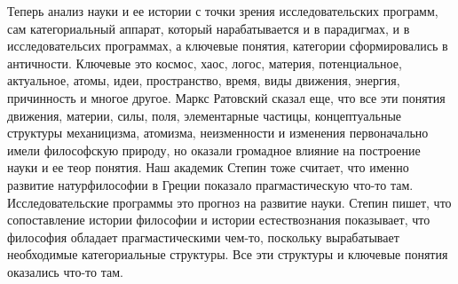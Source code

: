 \documentclass[a4paper, 12pt]{article}
\begin{document}
Теперь анализ науки и ее истории с точки зрения исследовательских 
программ, сам категориальный аппарат, который нарабатывается 
и в парадигмах, и в исследовательсих программах, а ключевые понятия, 
категории сформировались в античности. Ключевые это космос, хаос, логос, 
материя, потенциальное, актуальное, атомы, идеи, пространство, время, 
виды движения, энергия, причинность и многое другое. Маркс Ратовский 
сказал еще, что все эти понятия движения, материи, силы, поля, 
элементарные частицы, концептуальные структуры механицизма, атомизма, 
неизменности и изменения первоначально имели философскую природу, но 
оказали громадное влияние на построение науки и ее теор понятия. Наш 
академик Степин тоже считает, что именно развитие натурфилософии 
в Греции показало прагмастическую что-то там. Исследовательские 
программы это прогноз на развитие науки. Степин пишет, что сопоставление 
истории философии и истории естествознания показывает, что философия 
обладает прагмастическими чем-то, поскольку вырабатывает необходимые 
категориальные структуры. Все эти структуры и ключевые понятия оказались 
что-то там.
\end{document}
